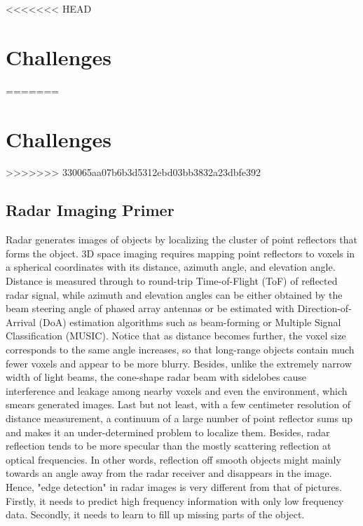 <<<<<<< HEAD
\section{Challenges}
=======
\section{Challenges} \label{challenges}
>>>>>>> 330065aa07b6b3d5312ebd03bb3832a23dbfe392
\subsection{Radar Imaging Primer}
Radar generates images of objects by localizing the cluster of point reflectors that forms the object. 3D space imaging requires mapping point reflectors to voxels in a spherical coordinates with its distance, azimuth angle, and elevation angle. Distance is measured through to round-trip Time-of-Flight (ToF) of reflected radar signal, while azimuth and elevation angles can be either obtained by the beam steering angle of phased array antennas or be estimated with Direction-of-Arrival (DoA) estimation algorithms such as beam-forming or Multiple Signal Classification (MUSIC). Notice that as distance becomes further, the voxel size corresponds to the same angle increases, so that long-range objects contain much fewer voxels and appear to be more blurry. Besides, unlike the extremely narrow width of light beams, the cone-shape radar beam with sidelobes cause interference and leakage among nearby voxels and even the environment, which smears generated images. Last but not least, with a few centimeter resolution of distance measurement, a continuum of a large number of point reflector sums up and makes it an under-determined problem to localize them. Besides, radar reflection tends to be more specular than the mostly scattering reflection at optical frequencies. In other words, reflection off smooth objects might mainly towards an angle away from the radar receiver and disappears in the image. Hence, "edge detection" in radar images is very different from that of pictures. Firstly, it needs to predict high frequency information with only low frequency data. Secondly, it needs to learn to fill up missing parts of the object. 

